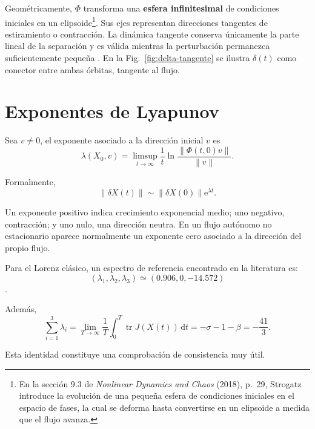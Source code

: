\documentclass[12pt,a4paper,oneside]{report}
\numberwithin{equation}{chapter}
\newcommand{\dd}{\mathrm{d}}
\newcommand{\e}{\mathrm{e}}
\newcommand{\tr}{\operatorname{tr}}
\newcommand{\norm}[1]{\left\lVert #1\right\rVert}
\begin{document}
Geométricamente, \(\Phi\) transforma una \textbf{esfera infinitesimal} de condiciones iniciales en un elipsoide\footnote{En la sección 9.3 de \textit{Nonlinear Dynamics and Chaos} (2018), p.~29, Strogatz introduce la evolución de una pequeña esfera de condiciones iniciales en el espacio de fases, la cual se deforma hasta convertirse en un elipsoide a medida que el flujo avanza.}. Sus ejes representan direcciones tangentes de estiramiento o contracción. La dinámica tangente conserva únicamente la parte lineal de la separación y es válida mientras la perturbación permanezca suficientemente pequeña \cite{benettin1980}. En la Fig.~\ref{fig:delta-tangente} se ilustra $\delta(t)$ como conector entre ambas órbitas, tangente al flujo.

\chapter{Exponentes de Lyapunov}

Sea \(v\neq0\), el exponente asociado a la dirección inicial \(v\) es
\begin{equation}
    \lambda(X_0,v)= \limsup_{t\to\infty} \frac{1}{t} \ln \frac{\norm{\Phi(t,0)v}}{\norm{v}}.
\end{equation}

Formalmente,
\begin{equation}
    \norm{\delta X(t)} \sim \norm{\delta X(0)}\e^{\lambda t}.
\end{equation}

Un exponente positivo indica crecimiento exponencial medio; uno negativo, contracción; y uno nulo, una dirección neutra. En un flujo autónomo no estacionario aparece normalmente un exponente cero asociado a la dirección del propio flujo.

Para el Lorenz clásico, un espectro de referencia encontrado en la literatura es:
\begin{equation}
    (\lambda_1,\lambda_2,\lambda_3) \simeq(0.906,0,-14.572)
    \label{eq:espectro-ref}
\end{equation}
\cite{sprott2005}. 

Además,
\begin{equation}
    \sum_{i=1}^{3}\lambda_i = \lim_{T\to\infty}\frac1T \int_0^T\tr J(X(t))\,\dd t =-\sigma-1-\beta=-\frac{41}{3}.
    \label{eq:suma}
\end{equation}

Esta identidad constituye una comprobación de consistencia muy útil.
\end{document}

